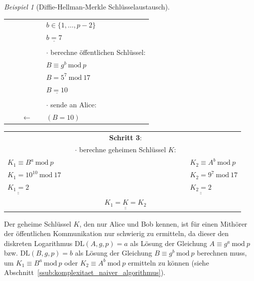 \documentclass[
  a4paper,
  11pt,
]{scrartcl}
\theoremstyle{plain}
\theoremstyle{definition}
\theoremstyle{remark}
\newtheorem{beispiel}{Beispiel}
\newcommand{\Mod}[1]{\ \mathrm{mod}\ #1}
\def\doubleunderline#1{\underline{\underline{#1}}} %
\begin{document}
\begin{beispiel}[Diffie-Hellman-Merkle Schlüsselaustausch]
\begin{center}
\begin{tabularx}{\textwidth}{lXcXl}
      & & & & $b \in \{1, \dots, p-2\}$\\
      & & & & $\underline{b=7}$\\
      & & & & \\
      & & & & $\cdot$ berechne öffentlichen Schlüssel:\\
      & & & & $B \equiv g^b \Mod{p}$\\
      & & & & $B = 5^7 \Mod{17}$\\
      & & & & $\underline{B = 10}$\\
      & & & & \\
      & & & & $\cdot$ sende an Alice:\\
      & & $\leftarrow$ & & $(B=10)$ \\\midrule
    \end{tabularx}
    \begin{tabularx}{\textwidth}{lXcXl}
      & & \textbf{Schritt 3}: & & \\
      & & $\cdot$ berechne geheimen Schlüssel $K$: & & \\
      $K_1 \equiv B^a \Mod{p}$ & & & & $K_2 \equiv A^b \Mod{p}$\\
      $K_1 = 10^{10} \Mod{17}$ & & & & $K_2 = 9^7 \Mod{17}$\\
      $\doubleunderline{K_1 = 2}$ & & & & $\doubleunderline{K_2 = 2}$\\
      & & $\doubleunderline{K_1 = K = K_2}$ & &\\\midrule
    \end{tabularx}
  \end{center}
  Der geheime Schlüssel $K$, den nur Alice und Bob kennen, ist für einen
  Mithörer der öffentlichen Kommunikation nur schwierig zu ermitteln, da dieser
  den diskreten Logarithmus $\text{DL}(A,g,p) = a$ als Lösung der Gleichung
  $A \equiv g^a \Mod{p}$ bzw. $\text{DL}(B,g,p) = b$ als Lösung der Gleichung
  $B \equiv g^b \Mod{p}$ berechnen muss, um $K_1 \equiv B^a \Mod{p}$ oder
  $K_2 \equiv A^b \Mod{p}$ ermitteln zu können (siehe Abschnitt~\ref{ssub:komplexitaet_naiver_algorithmus}).
\end{beispiel}
\end{document}
